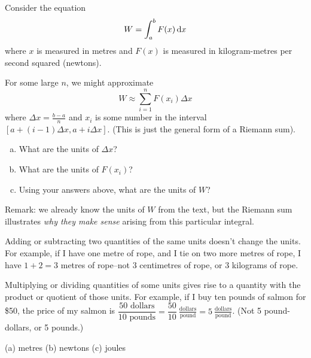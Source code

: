\begin{question}\label{prob_s2.1:integralsandunits}
Consider the equation
\[W = \int_a^b F(x)\,\mathrm{d}x\]
where $x$ is measured in metres and $F(x)$ is measured in kilogram-metres per second squared (newtons).

For some large $n$, we might approximate
\[W \approx \sum_{i=1}^n F(x_i)\Delta x \]
where $\Delta x = \frac{b-a}{n}$ and $x_i$ is some number in the interval $[a+(i-1)\Delta x, a+i\Delta x]$. (This is just the general form of a Riemann sum).
\begin{enumerate}[(a)]
\item What are the units of $\Delta x$?
\item What are the units of $F(x_i)$?
\item Using your answers above, what are the units of $W$?
\end{enumerate}
Remark: we already know the units of $W$ from the text, but the Riemann sum illustrates \emph{why they make sense} arising from this particular integral.
\end{question}
\begin{hint}
Adding or subtracting two quantities of the same units doesn't change the units. For example, if I have one metre of rope, and I tie on two more metres of rope, I have $1+2=3$ metres of rope--not 3 centimetres of rope, or 3 kilograms of rope.

Multiplying or dividing quantities of some units gives rise to a quantity with the product or quotient of those units. For example, if I buy ten pounds of salmon for \$50, the price of my salmon is $\dfrac{50\text{ dollars} }{10\text{ pounds}} = \dfrac{50}{10}~\frac{\text{dollars}}{\text{pound}} = 5 ~\frac{\text{dollars}}{\text{pound}}$. (Not 5 pound-dollars, or 5 pounds.)
\end{hint}
\begin{answer}
(a) metres \qquad (b) newtons \qquad (c) joules
\end{answer}
